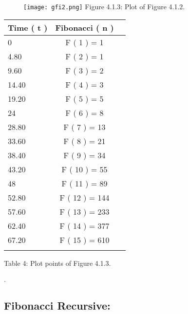 \documentclass[10pt,a4paper]{article}
\begin{document}
\begin{multicols}{2}
\begin{figure}[H]
\texttt{[image: gfi2.png]}
\centering \linebreak \linebreak Figure 4.1.3: Plot of Figure 4.1.2.
\end{figure}

\begin{center}
\begin{tabular}[.5cm]{l c c }
\toprule
Time ( t ) & Fibonacci ( n ) \\
\midrule
0 & F ( 1 ) = 1 \\
\cmidrule{1-2}
4.80 & F ( 2 ) = 1 \\
\cmidrule{1-2}
9.60 & F ( 3 ) = 2 \\
\cmidrule{1-2}
14.40 & F ( 4 ) = 3 \\
\cmidrule{1-2}
19.20 & F ( 5 ) = 5 \\
\cmidrule{1-2}
24 & F ( 6 ) = 8 \\
\cmidrule{1-2}
28.80 & F ( 7 ) = 13 \\
\cmidrule{1-2}
33.60 & F ( 8 ) = 21 \\
\cmidrule{1-2}
38.40 & F ( 9 ) = 34 \\
\cmidrule{1-2}
43.20 & F ( 10 ) = 55 \\
\cmidrule{1-2}
48 & F ( 11 ) = 89 \\
\cmidrule{1-2}
52.80 & F ( 12 ) = 144 \\
\cmidrule{1-2}
57.60 & F ( 13 ) = 233 \\
\cmidrule{1-2}
62.40 & F ( 14 ) = 377 \\
\cmidrule{1-2}
67.20 & F ( 15 ) = 610 \\
\bottomrule
\linebreak
\end{tabular}
\linebreak Table 4: Plot points of Figure 4.1.3.
\end{center}
\end{multicols} 

{\bfseries\itshape\color{OliveGreen}{Observation:}} {\itshape\color{OliveGreen}{As we can see, according to section 3.3 It is demonstrated that the algorithm is of linear order}}. 

\pagebreak

\subsection{Fibonacci Recursive:}
\end{document}
